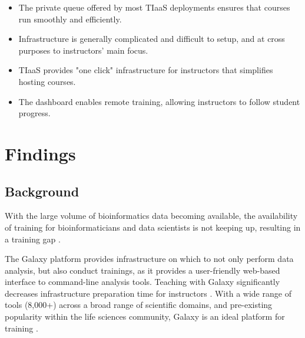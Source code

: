 \documentclass[a4paper,num-refs]{oup-contemporary}
\begin{document}
\begin{keypoints*}
\begin{itemize}
\item The private queue offered by most TIaaS deployments ensures that courses run smoothly and efficiently.
\item Infrastructure is generally complicated and difficult to setup, and at cross purposes to instructors' main focus.
\item TIaaS provides "one click" infrastructure for instructors that simplifies hosting courses.
\item The dashboard enables remote training, allowing instructors to follow student progress.
\end{itemize}
\end{keypoints*}

\section{Findings}
\subsection{Background}


With the large volume of bioinformatics data becoming available, the availability of training for bioinformaticians and data scientists is not keeping up, resulting in a training gap \cite{Attwood2017}.

The Galaxy platform \cite{afgan2018galaxy} provides infrastructure on which to not only perform data analysis, but also conduct trainings, as it provides a user-friendly web-based interface to command-line analysis tools. Teaching with Galaxy significantly decreases infrastructure preparation time for instructors \cite{gtn2}. With a wide range of tools (8,000+) across a broad range of scientific domains, and pre-existing popularity within the life sciences community, Galaxy is an ideal platform for training \cite{gtn,gtn2}.
\end{document}
